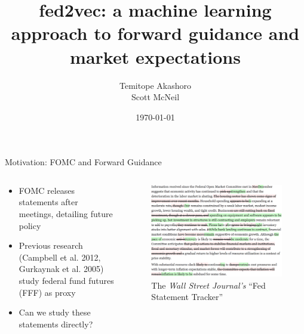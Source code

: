 \documentclass{beamer}
\title{fed2vec: a machine learning approach to forward guidance and market expectations}
\author{Temitope Akashoro\\
		Scott McNeil}
\date{\today}
\begin{document}
\begin{frame}
  \titlepage
\end{frame}


\begin{frame}{Motivation: FOMC and Forward Guidance}

\begin{columns}
	\begin{column}{0.5\textwidth}
		\begin{itemize}
			\item FOMC releases statements after meetings, detailing future policy
			\item Previous research (Campbell et al. 2012, Gurkaynak et al. 2005) study federal fund futures (FFF) as proxy
			\item Can we study these statements directly?
		\end{itemize}
	\end{column}
	\begin{column}{0.5\textwidth}
		\begin{figure}
			\includegraphics[width=1.05\textwidth]{fomcstatement.png}
			\caption{The \emph{Wall Street Journal's} \textquotedblleft Fed Statement Tracker\textquotedblright}
		\end{figure}
	\end{column}
\end{columns}

\end{frame}
\end{document}
